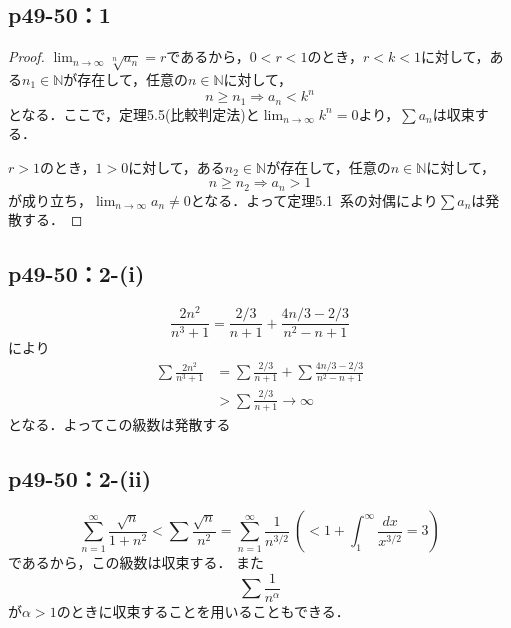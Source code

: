 \documentclass[uplatex,dvipdfmx,a4paper,10pt,fleqn]{jsarticle}
\begin{document}
    \subsection*{p49-50：1}

\begin{tleftbar}
	\begin{proof}
		$\lim_{n \to \infty} \sqrt[n]{a_n} =r$であるから，$0<r<1$のとき，$r<k<1$に対して，ある$n_1 \in \mathbb{N}$が存在して，任意の$n \in \mathbb{N}$に対して，
		\[
			n \ge n_1 \Longrightarrow a_n<k^n
		\]
		となる．ここで，定理5.5(比較判定法)と$\lim_{n \to \infty} k^n =0$より，$\sum a_n$は収束する．

		$r>1$のとき，$1>0$に対して，ある$n_2 \in \mathbb{N}$が存在して，任意の$n \in \mathbb{N}$に対して，
		\[
			n \ge n_2 \Longrightarrow a_n >1
		\]
		が成り立ち，$\lim_{n \to \infty} a_n \ne 0$となる．よって定理5.1~系の対偶により$\sum a_n$は発散する．
	\end{proof}
\end{tleftbar}


\subsection*{p49-50：2-(i)}

\begin{screen}
	\[
	\frac{2n^2}{n^3+1}=\frac{2/3}{n+1}+\frac{4n/3-2/3}{n^2-n+1}
	\]
	により
	\begin{align*}
	\sum \frac{2n^2}{n^3+1}&=\sum \frac{2/3}{n+1}+\sum \frac{4n/3-2/3}{n^2-n+1} \\
	&>\sum \frac{2/3}{n+1} \rightarrow \infty
	\end{align*}
	となる．よってこの級数は発散する
	\end{screen}
	

    \subsection*{p49-50：2-(ii)}

	\begin{screen}
	\[
	\sum ^{\infty}_{n=1}\frac{\sqrt{n}}{1+n^2}<\sum \frac{\sqrt{n}}{n^2}=\sum^{\infty}_{n=1}\frac{1}{n^{3/2}}~\left(<1+\int^{\infty}_{1}\frac{dx}{x^{3/2}}=3\right)
	\]
    であるから，この級数は収束する．
	また
	\[
	\sum \frac{1}{n^\alpha}
	\]
	が$\alpha >1$のときに収束することを用いることもできる．
	\end{screen}
\end{document}

